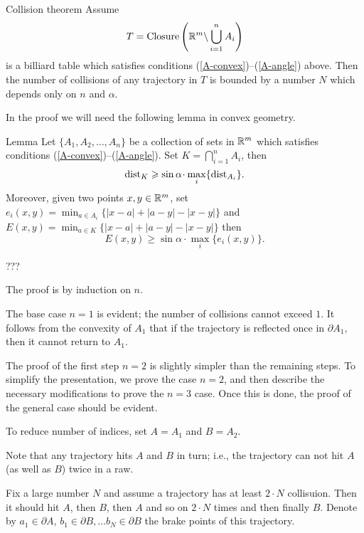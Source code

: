 \begin{thm}{Collision theorem}\label{thm:baby-collision}
Assume 
$$T=\operatorname{Closure}\left(\mathbb{R}^m\backslash \bigcup_{i=1}^n A_i\right)$$
is a billiard table which satisfies conditions (\ref{A-convex})--(\ref{A-angle}) above.
Then the number of collisions of any trajectory in  $T$  is bounded
by a number $N$ which depends only on $n$ and $\alpha$.

\end{thm}

In the proof we will need the following lemma in convex geometry.

\begin{thm}{Lemma}\label{lem:sina}
Let $\{A_1,A_2,\dots,A_n\}$ be a collection of sets in $\mathbb{R}^m$
which satisfies conditions (\ref{A-convex})--(\ref{A-angle}).
Set $K=\bigcap_{i=1}^n A_i$, then
$$\Dist_{K}\ge \sin\alpha \cdot \max_i\{\Dist_{A_i}\}.$$
Moreover, given two points $x,y\in \mathbb{R}^m$, set $e_i(x,y)=\min_{a\in A_i}\{|x-a|+|a-y|-|x-y|\}$ and $E(x,y)=\min_{a\in K}\{|x-a|+|a-y|-|x-y|\}$
then
$$E(x,y)\ge \sin\alpha 
\cdot \max_i\{e_i(x,y)\}.$$

\end{thm}

???
\qeds


The proof is by induction on $n$.

The base case $n=1$ is evident; the number of collisions cannot exceed $1$.  
It follows from the convexity of $A_1$ that
if the trajectory is reflected once in $\partial A_1$, 
then it cannot return to $A_1$.

The proof of the first step $n=2$ is slightly simpler than the remaining steps.
To simplify the presentation, we prove the case $n=2$, 
and then describe the necessary modifications to prove the $n=3$ case.
Once this is done, the proof of the general case should be evident.

 To reduce number of indices, set $A=A_1$ and $B=A_2$. 

Note that any trajectory hits $A$ and $B$ in turn;
i.e., the trajectory can not hit $A$ (as well as $B$)
twice in a raw.

Fix a large number $N$ and assume a trajectory has at least $2\cdot N$ collisuion.
Then it should hit $A$,
then $B$,
then $A$
and so on $2\cdot N$ times
and then finally $B$.
Denote by 
$a_1\in \partial A$, 
$b_1\in \partial B,
\dots
b_N\in \partial B$
the brake points of this trajectory.

